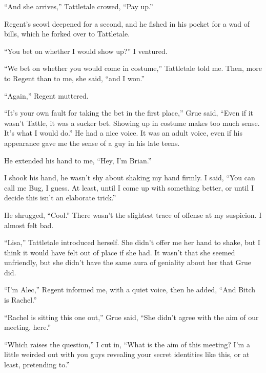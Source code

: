 ``And she arrives,'' Tattletale crowed, ``Pay up.''



Regent's scowl deepened for a second, and he fished in his pocket for a wad of bills, which he forked over to Tattletale.



``You bet on whether I would show up?'' I ventured.



``We bet on whether you would come in costume,'' Tattletale told me.  Then, more to Regent than to me, she said, ``and I won.''



``Again,'' Regent muttered.



``It's your own fault for taking the bet in the first place,'' Grue said, ``Even if it wasn't Tattle, it was a sucker bet.  Showing up in costume makes too much sense.  It's what I would do.''  He had a nice voice.  It was an adult voice, even if his appearance gave me the sense of a guy in his late teens.



He extended his hand to me, ``Hey, I'm Brian.''



I shook his hand, he wasn't shy about shaking my hand firmly.  I said, ``You can call me Bug, I guess.  At least, until I come up with something better, or until I decide this isn't an elaborate trick.''



He shrugged, ``Cool.''  There wasn't the slightest trace of offense at my suspicion.  I almost felt bad.



``Lisa,'' Tattletale introduced herself.  She didn't offer me her hand to shake, but I think it would have felt out of place if she had.  It wasn't that she seemed unfriendly, but she didn't have the same aura of geniality about her that Grue did.



``I'm Alec,'' Regent informed me, with a quiet voice, then he added, ``And Bitch is Rachel.''



``Rachel is sitting this one out,'' Grue said, ``She didn't agree with the aim of our meeting, here.''



``Which raises the question,'' I cut in, ``What is the aim of this meeting?  I'm a little weirded out with you guys revealing your secret identities like this, or at least, pretending to.''



